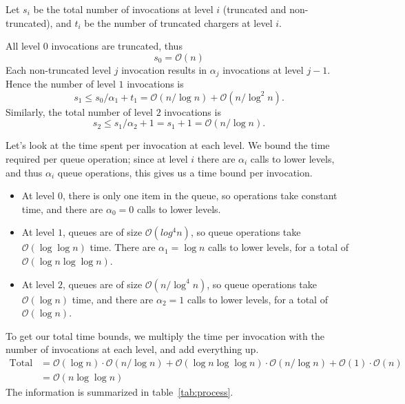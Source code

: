 \documentclass[11pt]{article}
\begin{document}
Let $s_i$ be the total number of invocations at level $i$ (truncated and non-truncated), and $t_i$ be the number of truncated chargers at level $i$.

All level $0$ invocations are truncated, thus
\[
s_0 = \mathcal{O}(n)
\]
 Each non-truncated level $j$ invocation results in $\alpha_j$ invocations at level $j-1$. Hence the number of level $1$ invocations is
\[
s_1 \leq s_0/\alpha_1 + t_1 = \mathcal{O}(n/\log n) + \mathcal{O}(n/\log^2 n).
\]
 Similarly, the total number of level $2$ invocations is
\[
s_2 \leq s_1/\alpha_2 + 1 = s_1 + 1 = \mathcal{O}(n/\log n).
\]

Let's look at the time spent per invocation at each level. We bound the time required per queue operation; since at level $i$ there are $\alpha_i$ calls to lower levels, and thus $\alpha_i$ queue operations, this gives us a time bound per invocation.

\begin{itemize}
\item At level $0$, there is only one item in the queue, so operations take constant time, and there are $\alpha_0 = 0$ calls to lower levels.
\item At level $1$, queues are of size $\mathcal{O}(log^4 n)$, so queue operations take $\mathcal{O}(\log \log n)$ time. There are $\alpha_1 = \log n$ calls to lower levels, for a total of $\mathcal{O}(\log n \log \log n)$.
\item At level $2$, queues are of size $\mathcal{O}(n/\log^4 n)$, so queue operations take $\mathcal{O}(\log n)$ time, and there are $\alpha_2 = 1$ calls to lower levels, for a total of $\mathcal{O}(\log n)$.
\end{itemize}

To get our total time bounds, we multiply the time per invocation with the number of invocations at each level, and add everything up.
\begin{align*}
  \text{Total} &= \mathcal{O}(\log n) \cdot \mathcal{O}(n/\log n) + \mathcal{O}(\log n \log \log n) \cdot \mathcal{O}(n/ \log n) + \mathcal{O}(1) \cdot \mathcal{O}(n) \\
               &= \mathcal{O}(n \log \log n)
\end{align*}
The information is summarized in table~\ref{tab:process}.
\end{document}
